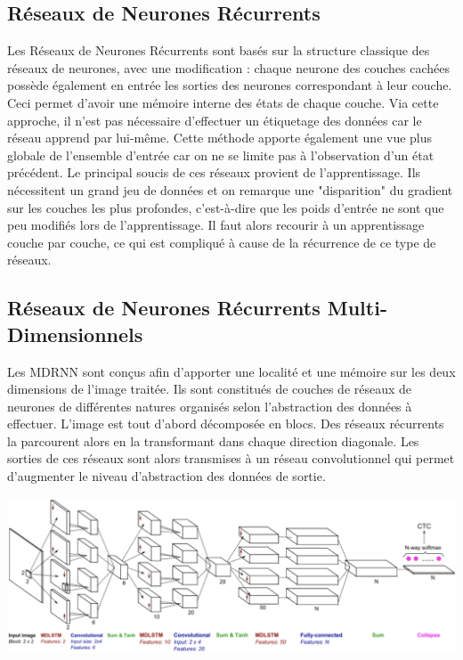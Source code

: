 \subsection{Réseaux de Neurones Récurrents}

Les Réseaux de Neurones Récurrents sont basés sur la structure classique des réseaux de neurones,
avec une modification : chaque neurone des couches cachées possède également en entrée les sorties
des neurones correspondant à leur couche. Ceci permet d'avoir une mémoire interne des états de chaque couche.
Via cette approche, il n'est pas nécessaire d'effectuer un étiquetage des données car le réseau apprend
par lui-même. Cette méthode apporte également une vue plus globale de l'ensemble d'entrée car on ne se limite
pas à l'observation d'un état précédent. Le principal soucis de ces réseaux provient de l'apprentissage.
Ils nécessitent un grand jeu de données et on remarque une "disparition" du gradient sur les couches les plus
profondes, c'est-à-dire que les poids d'entrée ne sont que peu modifiés lors de l'apprentissage. Il faut alors
recourir à un apprentissage couche par couche, ce qui est compliqué à cause de la récurrence de ce type de réseaux.

\subsection{Réseaux de Neurones Récurrents Multi-Dimensionnels}

Les MDRNN sont conçus afin d'apporter une localité et une mémoire sur les deux dimensions de l'image traitée.
Ils sont constitués de couches de réseaux de neurones de différentes natures organisés selon l'abstraction des
données à effectuer. L'image est tout d'abord décomposée en blocs. Des réseaux récurrents la parcourent alors
en la transformant dans chaque direction diagonale. Les sorties de ces réseaux sont alors transmises à un
réseau convolutionnel qui permet d'augmenter le niveau d'abstraction des données de sortie.

\newpage

\begin{mdframed}[frametitle={Schéma de structure d'un MDRNN}, innerbottommargin=10]
\begin{center}
\includegraphics[width=0.6\linewidth]{mdrnn.png}
\end{center}
\end{mdframed}

